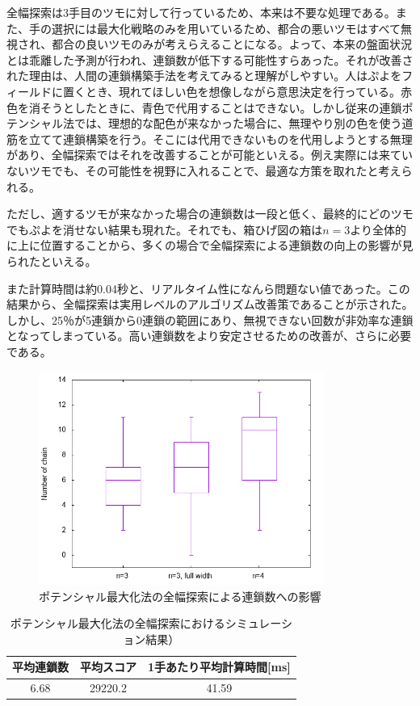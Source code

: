 \documentclass[12pt]{jreport}
\begin{document}
全幅探索は3手目のツモに対して行っているため、本来は不要な処理である。また、手の選択には最大化戦略のみを用いているため、都合の悪いツモはすべて無視され、都合の良いツモのみが考えらえることになる。よって、本来の盤面状況とは乖離した予測が行われ、連鎖数が低下する可能性すらあった。それが改善された理由は、人間の連鎖構築手法を考えてみると理解がしやすい。人はぷよをフィールドに置くとき、現れてほしい色を想像しながら意思決定を行っている。赤色を消そうとしたときに、青色で代用することはできない。しかし従来の連鎖ポテンシャル法では、理想的な配色が来なかった場合に、無理やり別の色を使う道筋を立てて連鎖構築を行う。そこには代用できないものを代用しようとする無理があり、全幅探索ではそれを改善することが可能といえる。例え実際には来ていないツモでも、その可能性を視野に入れることで、最適な方策を取れたと考えられる。

ただし、適するツモが来なかった場合の連鎖数は一段と低く、最終的にどのツモでもぷよを消せない結果も現れた。それでも、箱ひげ図の箱は$n=3$より全体的に上に位置することから、多くの場合で全幅探索による連鎖数の向上の影響が見られたといえる。

また計算時間は約0.04秒と、リアルタイム性になんら問題ない値であった。この結果から、全幅探索は実用レベルのアルゴリズム改善策であることが示された。しかし、25％が5連鎖から0連鎖の範囲にあり、無視できない回数が非効率な連鎖となってしまっている。高い連鎖数をより安定させるための改善が、さらに必要である。

\begin{figure}[tb]
  \begin{center}
  \includegraphics[height=7cm]{graph/Potential/chain_full.png}
  \caption{ポテンシャル最大化法の全幅探索による連鎖数への影響} \label{fig:poten_chain_width}
\end{center}
\end{figure}


\begin{table}[tb]
\begin{center}
\caption{ポテンシャル最大化法の全幅探索におけるシミュレーション結果）} \label{tab:poten_width}
\begin{tabular}{|c|c|c|} \hline
 平均連鎖数 & 平均スコア & 1手あたり平均計算時間[ms]\\ \hline
6.68 & 29220.2 & 41.59\\ \hline
\end{tabular}
\end{center}
\end{table}
\end{document}
